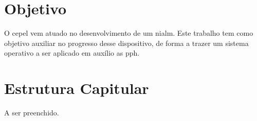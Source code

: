 \section{Objetivo}

O \gls{cepel} vem atuado no desenvolvimento de um \gls{nialm}. Este trabalho
tem como objetivo auxiliar no progresso desse dispositivo, de forma a trazer um
sistema operativo a ser aplicado em auxílio as \gls{pph}.

\section{Estrutura Capitular}

A ser preenchido.




